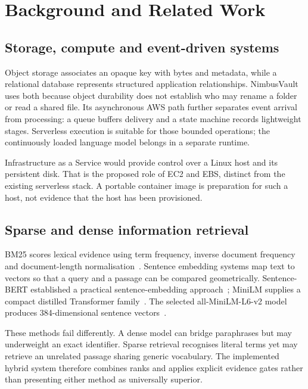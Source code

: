 \documentclass[11pt,a4paper,oneside]{report}
\begin{document}
\chapter{Background and Related Work}
\section{Storage, compute and event-driven systems}
Object storage associates an opaque key with bytes and metadata, while a relational database represents structured application relationships. NimbusVault uses both because object durability does not establish who may rename a folder or read a shared file. Its asynchronous AWS path further separates event arrival from processing: a queue buffers delivery and a state machine records lightweight stages. Serverless execution is suitable for those bounded operations; the continuously loaded language model belongs in a separate runtime.

Infrastructure as a Service would provide control over a Linux host and its persistent disk. That is the proposed role of EC2 and EBS, distinct from the existing serverless stack. A portable container image is preparation for such a host, not evidence that the host has been provisioned.
\section{Sparse and dense information retrieval}
BM25 scores lexical evidence using term frequency, inverse document frequency and document-length normalisation~\cite{bm25}. Sentence embedding systems map text to vectors so that a query and a passage can be compared geometrically. Sentence-BERT established a practical sentence-embedding approach~\cite{sbert}; MiniLM supplies a compact distilled Transformer family~\cite{minilm}. The selected all-MiniLM-L6-v2 model produces 384-dimensional sentence vectors~\cite{minilmcard}.

These methods fail differently. A dense model can bridge paraphrases but may underweight an exact identifier. Sparse retrieval recognises literal terms yet may retrieve an unrelated passage sharing generic vocabulary. The implemented hybrid system therefore combines ranks and applies explicit evidence gates rather than presenting either method as universally superior.
\end{document}
